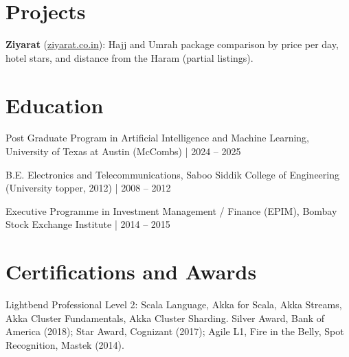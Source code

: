 \documentclass[10pt,a4paper]{article}
\begin{document}
\section*{Projects}
\textbf{Ziyarat} (\href{https://ziyarat.co.in}{ziyarat.co.in}): Hajj and Umrah package comparison by price per day, hotel stars, and distance from the Haram (partial listings).\par

\section*{Education}
Post Graduate Program in Artificial Intelligence and Machine Learning, University of Texas at Austin (McCombs) | 2024 -- 2025\par
B.E. Electronics and Telecommunications, Saboo Siddik College of Engineering (University topper, 2012) | 2008 -- 2012\par
Executive Programme in Investment Management / Finance (EPIM), Bombay Stock Exchange Institute | 2014 -- 2015\par

\section*{Certifications and Awards}
Lightbend Professional Level 2: Scala Language, Akka for Scala, Akka Streams, Akka Cluster Fundamentals, Akka Cluster Sharding. Silver Award, Bank of America (2018); Star Award, Cognizant (2017); Agile L1, Fire in the Belly, Spot Recognition, Mastek (2014).
\end{document}
